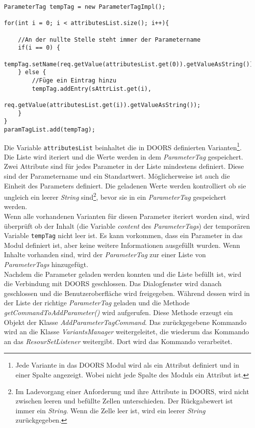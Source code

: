 \begin{lstlisting}[caption={Auszug von der Erstellung der ParameterTags}, captionpos=b,label={lst:CreateParamTag}]
ParameterTag tempTag = new ParameterTagImpl();
		
for(int i = 0; i < attributesList.size(); i++){
	
	//An der nullte Stelle steht immer der Parametername
	if(i == 0) {
		tempTag.setName(req.getValue(attributesList.get(0)).getValueAsString());
	} else {
		//Füge ein Eintrag hinzu 
		tempTag.addEntry(sAttrList.get(i),
				req.getValue(attributesList.get(i)).getValueAsString());
	}
}
paramTagList.add(tempTag);
\end{lstlisting}


Die Variable \texttt{attributesList} beinhaltet die in DOORS definierten Varianten\footnote{Jede Variante in das DOORS Modul wird als ein Attribut definiert und in einer Spalte angezeigt. Wobei nicht jede Spalte des Moduls ein Attribut ist.}. Die Liste wird iteriert und die Werte werden in dem \textit{ParameterTag} gespeichert. Zwei Attribute sind für jedes Parameter in der Liste mindestens definiert. Diese sind der Parametername und ein Standartwert. Möglicherweise ist auch die Einheit des Parameters definiert. Die geladenen Werte werden kontrolliert ob sie ungleich ein leerer \textit{String} sind\footnote{Im Ladevorgang einer Anforderung und ihre Attribute in DOORS, wird nicht zwischen leeren und befüllte Zellen unterschieden. Der Rückgabewert ist immer ein \textit{String}. Wenn die Zelle leer ist, wird ein leerer \textit{String} zurückgegeben.}, bevor sie in ein \textit{ParameterTag} gespeichert werden.\\


Wenn alle vorhandenen Varianten für diesen Parameter iteriert worden sind, wird überprüft ob der Inhalt (die Variable \textit{content} des \textit{ParameterTags}) der temporären Variable \texttt{tempTag} nicht leer ist. Es kann vorkommen, dass ein Parameter in das Modul definiert ist, aber keine weitere Informationen ausgefüllt wurden. Wenn Inhalte vorhanden sind, wird der \textit{ParameterTag} zur einer Liste von \textit{ParameterTags} hinzugefügt.\\

Nachdem die Parameter geladen werden konnten und die Liste befüllt ist, wird die Verbindung mit DOORS geschlossen. Das Dialogfenster wird danach geschlossen und die Benutzeroberfläche wird freigegeben. Während dessen wird in der Liste der richtige \textit{ParameterTag} geladen und die Methode \textit{getCommandToAddParameter()} wird aufgerufen. Diese Methode erzeugt ein Objekt der Klasse \textit{AddParameterTagCommand}. Das zurückgegebene Kommando wird an die Klasse \textit{VariantsManager} weitergeleitet, die wiederum das Kommando an das \textit{ResourSetListener} weitergibt. Dort wird das Kommando verarbeitet.\\


